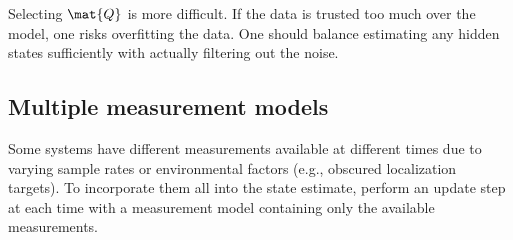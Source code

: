 Selecting $\mat{Q}$ is more difficult. If the data is trusted too much over the
model, one risks overfitting the data. One should balance estimating any hidden
\glspl{state} sufficiently with actually filtering out the noise.

\subsection{Multiple measurement models}

Some systems have different measurements available at different times due to
varying sample rates or environmental factors (e.g., obscured localization
targets). To incorporate them all into the state estimate, perform an update
step at each time with a measurement model containing only the available
measurements.

